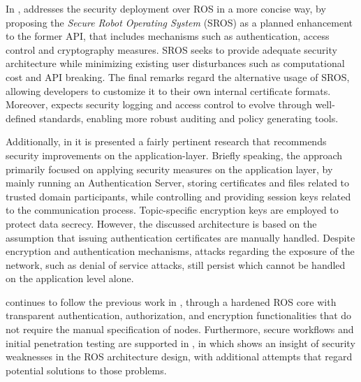 
In , \citeauthor{white2016sros} addresses the security deployment over ROS in a more concise way, by proposing the \textit{Secure Robot Operating System} (SROS) as a planned enhancement to the former API, that includes mechanisms such as authentication, access control and cryptography measures. SROS seeks to provide adequate security architecture while minimizing existing user disturbances such as computational cost and API breaking. The final remarks regard the alternative usage of SROS, allowing developers to customize it to their own internal certificate formats. Moreover, \citeauthor{white2016sros} expects security logging and access control to evolve through well-defined standards, enabling more robust auditing and policy generating tools. 

Additionally, in  it is presented a fairly pertinent research that recommends security improvements on the application-layer. Briefly speaking, the approach primarily focused on applying security measures on the application layer, by mainly running an Authentication Server, storing certificates and files related to trusted domain participants, while controlling and providing session keys related to the communication process. Topic-specific encryption keys are employed to protect data secrecy. However, the discussed architecture is based on the assumption that issuing authentication certificates are manually handled. Despite encryption and authentication mechanisms, attacks regarding the exposure of the network, such as denial of service attacks, still persist which cannot be handled on the application level alone. 

\citeauthor*{breiling2017secure} continues to follow the previous work in , through a hardened ROS core with transparent authentication, authorization, and encryption functionalities that do not require the manual specification of nodes. Furthermore, secure workflows and initial penetration testing are supported in , in which \citeauthor{dieber2017security} shows an insight of security weaknesses in the ROS architecture design, with additional attempts that regard potential solutions to those problems.

